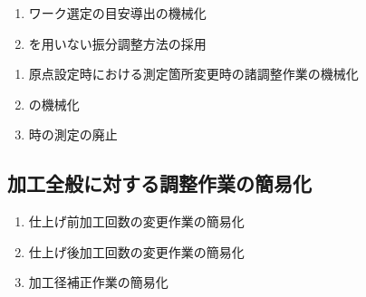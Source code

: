 




\begin{enumerate}[label=\sarrow]
\item ワーク\FixtureBolt 選定の目安導出の機械化
\item \Spacer を用いない振分調整方法の採用
\end{enumerate}



\begin{enumerate}[label=\sarrow]
\item {}原点設定時における測定箇所変更時の諸調整作業の機械化
\item \CenterlineEndFaceDifMeasurement の機械化
\item \CurvedOutcutMilling 時の測定の廃止
\end{enumerate}





\subsection{加工全般に対する調整作業の簡易化\TBW}
\begin{enumerate}[label=\sarrow]
\item 仕上げ前加工回数の変更作業の簡易化
\item 仕上げ後加工回数の変更作業の簡易化
\item 加工径補正作業の簡易化
\end{enumerate}




